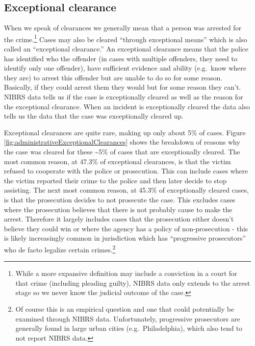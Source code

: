 \documentclass[
  12pt,
  openany]{book}
\begin{document}
\hypertarget{exceptional-clearance}{%
\subsection{Exceptional clearance}\label{exceptional-clearance}}

When we speak of clearances we generally mean that a person was arrested for the crime.\footnote{While a more expansive definition may include a conviction in a court for that crime (including pleading guilty), NIBRS data only extends to the arrest stage so we never know the judicial outcome of the case.} Cases may also be cleared ``through exceptional means'' which is also called an ``exceptional clearance.'' An exceptional clearance means that the police has identified who the offender (in cases with multiple offenders, they need to identify only one offender), have sufficient evidence and ability (e.g.~know where they are) to arrest this offender but are unable to do so for some reason. Basically, if they could arrest them they would but for some reason they can't. NIBRS data tells us if the case is exceptionally cleared as well as the reason for the exceptional clearance. When an incident is exceptionally cleared the data also tells us the data that the case was exceptionally cleared up.

Exceptional clearances are quite rare, making up only about 5\% of cases. Figure \ref{fig:administrativeExceptionalClearances} shows the breakdown of reasons why the case was cleared for these \textasciitilde5\% of cases that are exceptionally cleared. The most common reason, at 47.3\% of exceptional clearances, is that the victim refused to cooperate with the police or prosecution. This can include cases where the victim reported their crime to the police and then later decide to stop assisting. The next most common reason, at 45.3\% of exceptionally cleared cases, is that the prosecution decides to not prosecute the case. This excludes cases where the prosecution believes that there is not probably cause to make the arrest. Therefore it largely includes cases that the prosecution either doesn't believe they could win or where the agency has a policy of non-prosecution - this is likely increasingly common in jurisdiction which has ``progressive prosecutors'' who de facto legalize certain crimes.\footnote{Of course this is an empirical question and one that could potentially be examined through NIBRS data. Unfortunately, progressive prosecutors are generally found in large urban cities (e.g.~Philadelphia), which also tend to not report NIBRS data.}
\end{document}
